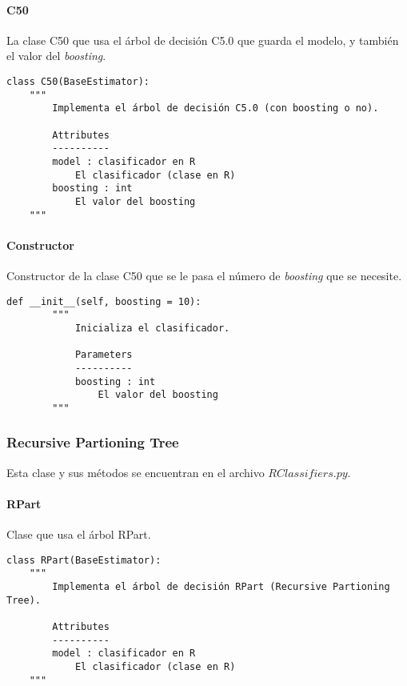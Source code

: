 \paragraph{C50}

La clase C50 que usa el árbol de decisión C5.0 que guarda el modelo, y también el valor del \emph{boosting}.

\begin{lstlisting}
class C50(BaseEstimator):
    """
        Implementa el árbol de decisión C5.0 (con boosting o no).

        Attributes
        ----------
        model : clasificador en R
            El clasificador (clase en R)
        boosting : int
            El valor del boosting
    """
\end{lstlisting}

\paragraph{Constructor}

Constructor de la clase C50 que se le pasa el número de \emph{boosting} que se necesite.

\begin{lstlisting}
def __init__(self, boosting = 10):
        """
            Inicializa el clasificador.

            Parameters
            ----------
            boosting : int
                El valor del boosting
        """
\end{lstlisting}

\subsubsection{Recursive Partioning Tree}

Esta clase y sus métodos se encuentran en el archivo $RClassifiers.py$.

\paragraph{RPart}

Clase que usa el árbol RPart.

\begin{lstlisting}
class RPart(BaseEstimator):
    """
        Implementa el árbol de decisión RPart (Recursive Partioning Tree).

        Attributes
        ----------
        model : clasificador en R
            El clasificador (clase en R)
    """
\end{lstlisting}

